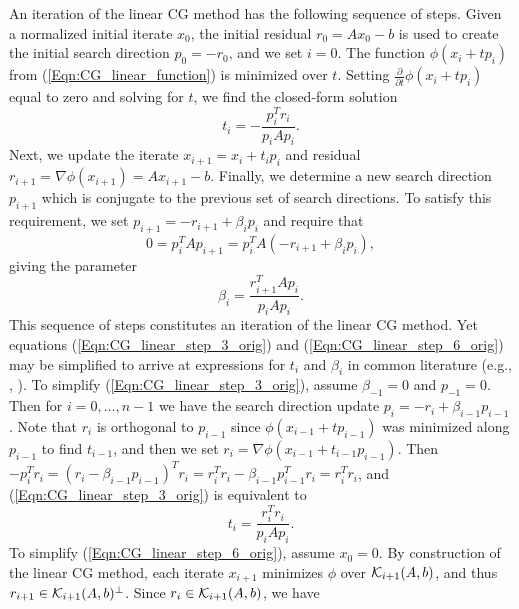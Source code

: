 \begin{enumerate}
An iteration of the linear CG method has the following sequence of steps.  Given a normalized initial iterate $x_0$, the initial residual $r_0 = Ax_0 - b$ is used to create the initial search direction $p_0 = -r_0$, and we set $i=0$.  The function $\phi(x_i + t p_i)$ from (\ref{Eqn:CG_linear_function}) is minimized over $t$.  Setting $\frac{\partial}{\partial t}\phi(x_i + t p_i)$ equal to zero and solving for $t$, we find the closed-form solution
\begin{equation}				\label{Eqn:CG_linear_step_3_orig}
t_i = -\frac{p_i^Tr_i}{p_iAp_i}.
\end{equation}
Next, we update the iterate $x_{i+1} = x_i + t_i p_i$ and residual $r_{i+1} = \nabla \phi (x_{i+1}) = A x_{i+1} - b$.  Finally, we determine a new search direction $p_{i+1}$ which is conjugate to the previous set of search directions.  To satisfy this requirement, we set $p_{i+1} = -r_{i+1} + \beta_i p_i$ and require that
\[
0 = p_i^TAp_{i+1} = p_i^TA( -r_{i+1} + \beta_i p_i),
\]
giving the parameter
\begin{equation}			\label{Eqn:CG_linear_step_6_orig}
\beta_i = \frac{r_{i+1}^TAp_i}{p_iAp_i}.
\end{equation}
This sequence of steps constitutes an iteration of the linear CG method.  Yet equations (\ref{Eqn:CG_linear_step_3_orig}) and (\ref{Eqn:CG_linear_step_6_orig}) may be simplified to arrive at expressions for $t_i$ and $\beta_i$ in common literature (e.g., \cite[Algorithm 11.3.3]{golub2012matrix}, \cite[Algorithm 5.2]{nocedal2006numerical}).
To simplify (\ref{Eqn:CG_linear_step_3_orig}), assume $\beta_{-1} = 0$ and $p_{-1} = 0$.  Then for $i = 0, \ldots, n-1$ we have the search direction update $p_i = -r_i + \beta_{i-1}p_{i-1}$.  Note that $r_i$ is orthogonal to $p_{i-1}$ since $\phi(x_{i-1} + t p_{i-1})$ was minimized along $p_{i-1}$ to find $t_{i-1}$, and then we set $r_i = \nabla \phi(x_{i-1} + t_{i-1} p_{i-1})$.  Then $-p_i^Tr_i = (r_i - \beta_{i-1}p_{i-1})^Tr_i = r_i^Tr_i - \beta_{i-1}p_{i-1}^Tr_i = r_i^Tr_i $, and (\ref{Eqn:CG_linear_step_3_orig}) is equivalent to  
\begin{equation}				\label{Eqn:CG_linear_step_3_in_algo}
t_i = \frac{r_i^Tr_i}{p_iAp_i}.
\end{equation}
To simplify (\ref{Eqn:CG_linear_step_6_orig}), assume $x_0 = 0$.
By construction of the linear CG method,  each iterate $x_{i+1}$ minimizes $\phi$ over ${\mathcal K}_{i+1}(A, b)$, and thus $r_{i+1} \in {\mathcal K}_{i+1} (A, b)^{\perp}$.  Since $r_{i} \in {\mathcal K}_{i+1}(A, b)$, we have 
\begin{equation} 		\label{Eqn:CG_linear_step_3_sub1}

\end{equation}
\end{enumerate}

